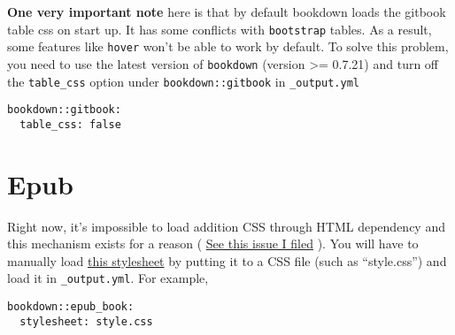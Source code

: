 \documentclass[]{book}
\begin{document}
\textbf{One very important note} here is that by default bookdown loads
the gitbook table css on start up. It has some conflicts with
\texttt{bootstrap} tables. As a result, some features like
\texttt{hover} won't be able to work by default. To solve this problem,
you need to use the latest version of \texttt{bookdown} (version
\textgreater{}= 0.7.21) and turn off the \texttt{table\_css} option
under \texttt{bookdown::gitbook} in \texttt{\_output.yml}

\begin{verbatim}
bookdown::gitbook:
  table_css: false
\end{verbatim}

\hypertarget{epub}{%
\section{Epub}\label{epub}}

Right now, it's impossible to load addition CSS through HTML dependency
and this mechanism exists for a reason (
\href{https://github.com/rstudio/rmarkdown/issues/1457}{See this issue I
filed} ). You will have to manually load
\href{https://github.com/haozhu233/kableExtra/blob/master/inst/bootstrapTable-3.3.7/bootstrapTable.min.css}{this
stylesheet} by putting it to a CSS file (such as ``style.css'') and load
it in \texttt{\_output.yml}. For example,

\begin{verbatim}
bookdown::epub_book: 
  stylesheet: style.css
\end{verbatim}


\end{document}
